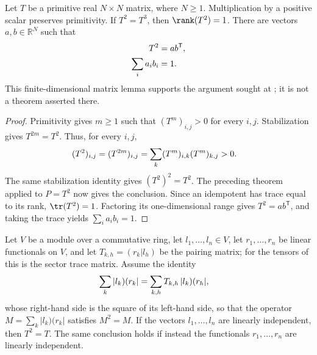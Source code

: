 \begin{lemma}
    \label{thm:matrix_primitive_pow_two_rank_one}
    \leanok
    Let $T$ be a primitive real $N\times N$ matrix, where $N\geq1$.
    Multiplication by a positive scalar preserves primitivity. If $T^2=T^3$,
    then $\rank(T^2)=1$. There are vectors $a,b\in\mathbb R^N$ such that
    \begin{align}
        T^2            & =ab^{\mathsf T},
        \notag                            \\
        \sum_i a_i b_i & =1.
        \notag
    \end{align}
    This finite-dimensional matrix lemma supports the argument sought at
    \cite[Appendix~C.2, line~1613]{Cirac2016MPDO_arXiv}; it is not a theorem
    asserted there.
\end{lemma}

\begin{proof}
    \leanok
    Primitivity gives $m\geq1$ such that $(T^m)_{i,j}>0$ for every $i,j$.
    Stabilization gives $T^{2m}=T^2$. Thus, for every $i,j$,
    \begin{align}
        (T^2)_{i,j}
         & =(T^{2m})_{i,j}
        =\sum_k(T^m)_{i,k}(T^m)_{k,j}>0.
        \notag
    \end{align}
    The same stabilization identity gives $(T^2)^2=T^2$.
    The preceding theorem applied to $P=T^2$ now gives the conclusion.
    Since an idempotent has trace equal to its rank, $\tr(T^2)=1$.
    Factoring its one-dimensional range gives $T^2=ab^{\mathsf T}$, and taking
    the trace yields $\sum_i a_i b_i=1$.
\end{proof}

\begin{lemma}
    \label{thm:matrix_pairing_idempotent}
    \leanok
    Let $V$ be a module over a commutative ring, let
    $l_1,\ldots,l_n\in V$, let $r_1,\ldots,r_n$ be linear functionals on
    $V$, and let $T_{k,h}=(r_k|l_h)$ be the pairing matrix; for the tensors of
    \cite[Appendix~C.2]{Cirac2016MPDO_arXiv} this is the sector trace matrix.
    Assume the identity
    \begin{align}
        \sum_k|l_k)(r_k|
         & =\sum_{k,h}T_{k,h}\,|l_k)(r_h|,
        \notag
    \end{align}
    whose right-hand side is the square of its left-hand side, so that the
    operator $M=\sum_k|l_k)(r_k|$ satisfies $M^2=M$. If the vectors
    $l_1,\ldots,l_n$ are linearly independent, then $T^2=T$.
    The same conclusion holds if instead the functionals
    $r_1,\ldots,r_n$ are linearly independent.
\end{lemma}

